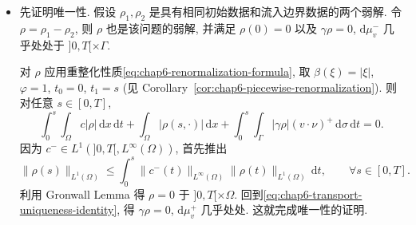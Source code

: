 \begin{sloppypar}
\begin{Proof}
\begin{itemize}
 \item 先证明唯一性. 假设 $\rho_1,\rho_2$ 是具有相同初始数据和流入边界数据的两个弱解. 令 $\rho=\rho_1-\rho_2$, 则 $\rho$ 也是该问题的弱解, 并满足 $\rho(0)=0$ 以及 $\gamma\rho=0$, $\mathrm d\mu_v^-$ 几乎处处于 $]0,T[\times\Gamma$.

 对 $\rho$ 应用重整化性质\eqref{eq:chap6-renormalization-formula}, 取 $\beta(\xi)=|\xi|$, $\varphi=1$, $t_0=0$, $t_1=s$ (见 Corollary~\ref{cor:chap6-piecewise-renormalization}). 则对任意 $s\in[0,T]$,
 \begin{equation}
  \int_0^s\int_\Omega c|\rho|\,\mathrm dx\,\mathrm dt
  +\int_\Omega|\rho(s,\cdot)|\,\mathrm dx
  +\int_0^s\int_\Gamma|\gamma\rho|(v\cdot\nu)^+\,\mathrm d\sigma\,\mathrm dt=0.
 \label{eq:chap6-transport-uniqueness-identity}
 \end{equation}
 因为 $c^-\in L^1(]0,T[,L^\infty(\Omega))$, 首先推出
 \[
  \|\rho(s)\|_{L^1(\Omega)}
  \leq\int_0^s\|c^-(t)\|_{L^\infty(\Omega)}
  \|\rho(t)\|_{L^1(\Omega)}\,\mathrm dt,
  \qquad\forall s\in[0,T].
 \]
 利用 Gronwall Lemma 得 $\rho=0$ 于 $]0,T[\times\Omega$. 回到\eqref{eq:chap6-transport-uniqueness-identity}, 得 $\gamma\rho=0$, $\mathrm d\mu_v^+$ 几乎处处. 这就完成唯一性的证明.


\end{itemize}
\end{Proof}
\end{sloppypar}
